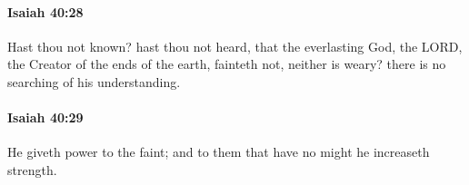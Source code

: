 		\paragraph{Isaiah 40:28} %
			\label{ISAIAH-40-28}

			Hast thou not known? hast thou not heard, that the everlasting God, the LORD, the Creator of the ends of the earth, fainteth not, neither is weary? there is no searching of his understanding.


		\paragraph{Isaiah 40:29} %
			\label{ISAIAH-40-29}

			He giveth power to the faint; and to them that have no might he increaseth strength.


